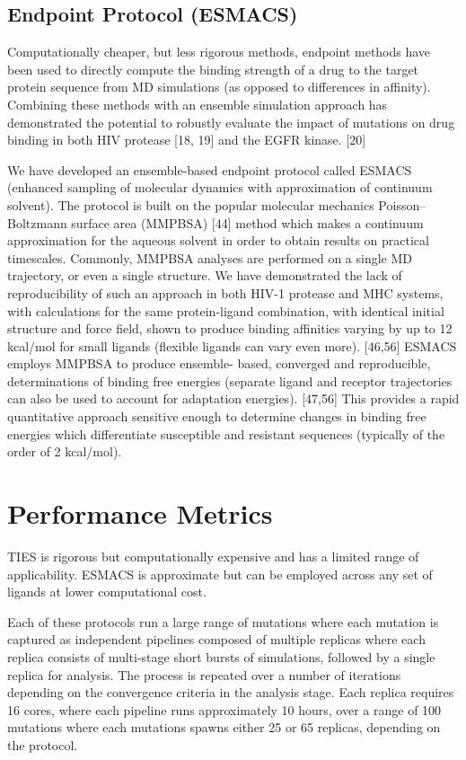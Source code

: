 \documentclass[conference]{IEEEtran}
\begin{document}
\subsection{Endpoint Protocol (ESMACS)}\label{sec:esmacs}

Computationally cheaper, but less rigorous methods, endpoint methods have been used to directly compute the binding strength of a drug to the target protein sequence from MD simulations (as opposed to differences in affinity). Combining these methods with an ensemble simulation approach has demonstrated the potential to robustly evaluate the impact of mutations on drug binding in both HIV protease [18, 19] and the EGFR kinase. [20]     

We have developed an ensemble-based endpoint protocol called ESMACS (enhanced sampling of molecular dynamics with approximation of continuum solvent). The protocol is built on the popular molecular mechanics Poisson–Boltzmann surface area (MMPBSA) [44] method which makes a continuum approximation for the aqueous solvent in order to obtain results on practical timescales. Commonly, MMPBSA analyses are performed on a single MD trajectory, or even a single structure. We have demonstrated the lack of reproducibility of such an approach in both HIV-1 protease and MHC systems, with calculations for the same protein-ligand combination, with identical initial structure and force field, shown to produce binding affinities varying by up to 12 kcal/mol for small ligands (flexible ligands can vary even more). [46,56] ESMACS employs MMPBSA to produce ensemble- based, converged and reproducible, determinations of binding free energies (separate ligand and receptor trajectories can also be used to account for adaptation energies). [47,56] This provides a rapid quantitative approach sensitive enough to determine changes in binding free energies which differentiate susceptible and resistant sequences (typically of the order of 2 kcal/mol).


\section{Performance Metrics}\label{sec:performance}

TIES is rigorous but computationally expensive and has a limited range of 
applicability. ESMACS is approximate but can be employed across any set of 
ligands at lower computational cost.

Each of these protocols run a large range of mutations where each 
mutation is captured as independent pipelines composed of multiple replicas 
where each replica consists of multi-stage short bursts 
of simulations, followed by a single replica for analysis. The process is 
repeated over a number of iterations depending on the convergence criteria 
in the analysis stage. Each replica requires 16 cores, where each pipeline 
runs approximately 10 hours, over a range of 100 mutations where each mutations 
spawns either 25 or 65 replicas, depending on the protocol.   
\end{document}
